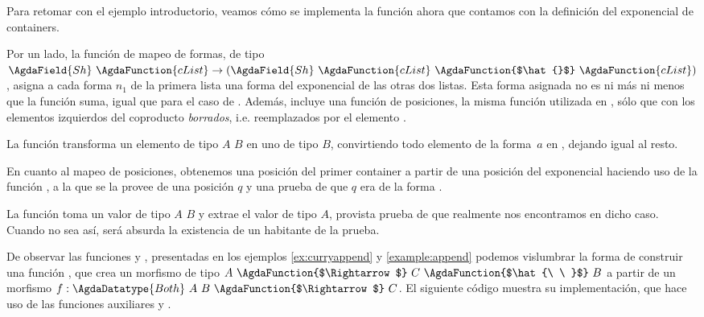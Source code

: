 \addtocounter{definition}{-2}
\begin{example}[Continuación] \label{ex:curryappend}

  Para retomar con el ejemplo introductorio, veamos cómo se implementa la función  ahora que contamos con la definición del exponencial de containers. 


  Por un lado, la función de mapeo de formas, de tipo $\AgdaField{Sh}\ \AgdaFunction{cList}  \to (\AgdaField{Sh}\ \AgdaFunction{cList}\ \AgdaFunction{$\hat{}$}\ \AgdaFunction{cList})$, asigna a cada forma $n_1$ de la primera lista una forma del exponencial de las otras dos listas. Esta forma asignada no es ni más ni menos que la función suma, igual que para el caso de . Además, incluye una función de posiciones, la misma función  utilizada en , sólo que con los elementos izquierdos del coproducto {\it borrados}, i.e. reemplazados por el elemento .
 
La función  transforma un elemento de tipo $A$ \AgdaFunction{$\uplus$} $B$ en uno de tipo \AgdaFunction{$\top$} \AgdaFunction{$\uplus$} $B$, convirtiendo todo elemento de la forma $\, a$ en , dejando igual al resto.


En cuanto al mapeo de posiciones, obtenemos una posición del primer container a partir de una posición del exponencial haciendo uso de la función , a la que se la provee de una posición $q$ y una prueba de que $q$ era de la forma .

La función  toma un valor de tipo $A$ \AgdaFunction{$\uplus$} $B$ y extrae el valor de tipo $A$, provista prueba de que realmente nos encontramos en dicho caso. Cuando no sea así, será absurda la existencia de un habitante de la prueba.  


\end{example}
\addtocounter{definition}{1}

De observar las funciones  y , presentadas en los ejemplos  \ref{ex:curryappend} y \ref{example:append} podemos vislumbrar la forma de construir una función \AgdaFunction{$\curry{\_}$}, que crea un morfismo de tipo $A \ \AgdaFunction{$\Rightarrow$}\  C\ \AgdaFunction{$\hat{\ \ }$}\ B$ a partir de un morfismo $f : \AgdaDatatype{Both}\ A\ B \ \AgdaFunction{$\Rightarrow$}\  C$. El siguiente código muestra su implementación, que hace uso de las funciones auxiliares  y  .

